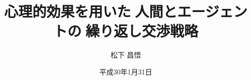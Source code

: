 \usepackage{gra_yasuda}
\usepackage{lscape}
\usepackage{graphicx}
\usepackage{here}
\usepackage{color}
\usepackage{amsmath}
\usepackage{subfig}
\usepackage{tascmac}
\usepackage{url}
\usepackage{ascmac}
\usepackage{booktabs}
\usepackage{otf}
\usepackage{comment}



\title{心理的効果を用いた人間とエージェントの繰り返し交渉戦略}

\author{松下 昌悟}



\date{平成30年1月31日}



\setlength{\baselineskip}{8truemm}
